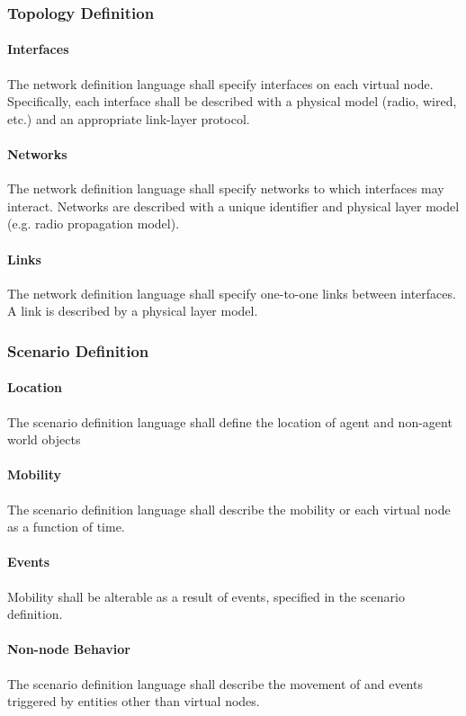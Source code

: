 \documentclass[titlepage]{article}
\begin{document}
\subsubsection{Topology Definition}
\paragraph{Interfaces} The network definition language shall specify interfaces on each virtual node.  Specifically,
each interface shall be described with a physical model (radio, wired, etc.) and an appropriate link-layer protocol.

\paragraph{Networks} The network definition language shall specify networks to which interfaces may interact.  Networks
are described with a unique identifier and physical layer model (e.g. radio propagation model).

\paragraph{Links} The network definition language shall specify one-to-one links between interfaces.  A link is
described by a physical layer model.

\subsubsection{Scenario Definition}
\paragraph{Location} The scenario definition language shall define the location of agent and non-agent world objects
\paragraph{Mobility} The scenario definition language shall describe the mobility or each virtual node as a function of
time.
\paragraph{Events} Mobility shall be alterable as a result of events, specified in the scenario definition.
\paragraph{Non-node Behavior} The scenario definition language shall describe the movement of and events triggered by
entities other than virtual nodes.
\end{document}
